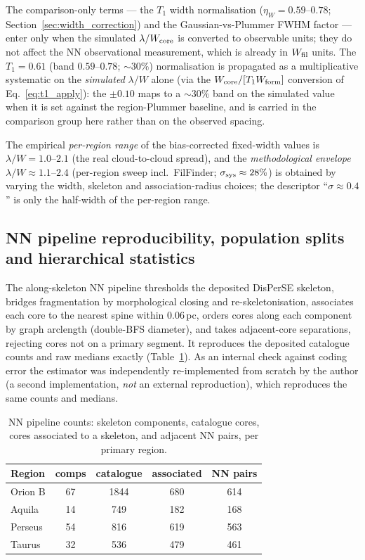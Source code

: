 \documentclass[usenatbib,twoside,twocolumn]{mnras}
\begin{document}
The comparison-only terms --- the $T_1$ width normalisation ($\eta_W=0.59$--$0.78$; Section~\ref{sec:width_correction}) and the Gaussian-vs-Plummer FWHM factor --- enter only when the simulated $\lambda/W_{\rm core}$ is converted to observable units; they do not affect the NN observational measurement, which is already in $W_{\rm fil}$ units. The $T_1=0.61$ (band $0.59$--$0.78$; $\sim30\%$) normalisation is propagated as a multiplicative systematic on the \emph{simulated} $\lambda/W$ alone (via the $W_{\rm core}/[T_1 W_{\rm form}]$ conversion of Eq.~\ref{eq:t1_apply}): the $\pm0.10$ maps to a $\sim30\%$ band on the simulated value when it is set against the region-Plummer baseline, and is carried in the comparison group here rather than on the observed spacing.

The empirical \emph{per-region range} of the bias-corrected fixed-width values is $\lambda/W=1.0$--$2.1$ (the real cloud-to-cloud spread), and the \emph{methodological envelope} $\lambda/W\approx1.1$--$2.4$ (per-region sweep incl.\ FilFinder; $\sigma_{\rm sys}\approx28\%$) is obtained by varying the width, skeleton and association-radius choices; the descriptor ``$\sigma\approx0.4$'' is only the half-width of the per-region range.

\subsection{NN pipeline reproducibility, population splits and hierarchical statistics}
\label{sec:nnpipeline}

The along-skeleton NN pipeline thresholds the deposited DisPerSE skeleton, bridges fragmentation by morphological closing and re-skeletonisation, associates each core to the nearest spine within $0.06$\,pc, orders cores along each component by graph arclength (double-BFS diameter), and takes adjacent-core separations, rejecting cores not on a primary segment. It reproduces the deposited catalogue counts and raw medians exactly (Table~\ref{tab:nnpipeline}). As an internal check against coding error the estimator was independently re-implemented from scratch by the author (a second implementation, \emph{not} an external reproduction), which reproduces the same counts and medians.

\begin{table}
\caption{NN pipeline counts: skeleton components, catalogue cores, cores associated to a skeleton, and adjacent NN pairs, per primary region.}
\label{tab:nnpipeline}
\footnotesize
\setlength{\tabcolsep}{4pt}
\begin{tabular}{lcccc}
\toprule
Region & comps & catalogue & associated & NN pairs \\
\midrule
Orion B & 67 & 1844 & 680 & 614 \\
Aquila  & 14 & 749  & 182 & 168 \\
Perseus & 54 & 816  & 619 & 563 \\
Taurus  & 32 & 536  & 479 & 461 \\
\bottomrule
\end{tabular}
\end{table}
\end{document}
